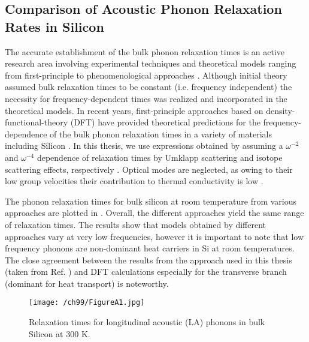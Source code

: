 \begin{appendices}

\chapter{Comparison of Acoustic Phonon Relaxation Rates in Silicon}
\label{app:si_relaxation_rates}
The accurate establishment of the bulk phonon relaxation times is an active research area involving experimental techniques and theoretical models ranging from first-principle to phenomenological approaches \cite{stokes_bulkSi_tau,RN273,RN217,ownNW,RN236}. Although initial theory assumed bulk relaxation times to be constant (i.e. frequency independent) the necessity for frequency-dependent times was realized and incorporated in the theoretical models. In recent years, first-principle approaches based on density-functional-theory (DFT) have provided theoretical predictions for the frequency-dependence of the bulk phonon relaxation times in a variety of materials including Silicon \cite{stokes_bulkSi_tau}. In this thesis, we use expressions obtained by assuming a $\omega^{-2}$ and  $\omega^{-4}$ dependence of relaxation times by Umklapp scattering and isotope scattering effects, respectively \cite{maldovan2011tf}. Optical modes are neglected, as owing to their low group velocities their contribution to thermal conductivity is low \cite{RN212}. 

The phonon relaxation times for bulk silicon at room temperature from various approaches are plotted in . Overall, the different approaches yield the same range of relaxation times. The results show that models obtained by different approaches vary at very low frequencies, however it is important to note that low frequency phonons are non-dominant heat carriers in Si at room temperatures. The close agreement between the results from the approach used in this thesis (taken from Ref. \cite{maldovan2011tf}) and DFT calculations \cite{stokes_bulkSi_tau,RN244} especially for the transverse branch (dominant for heat transport) is noteworthy.

\begin{figure}[hbt]
	\centering \texttt{[image: /ch99/FigureA1.jpg]}
	\caption{Relaxation times for longitudinal acoustic (LA) phonons in bulk Silicon at 300 K.}
	\label{fig:appendix-LA}
\end{figure}


\end{appendices}
